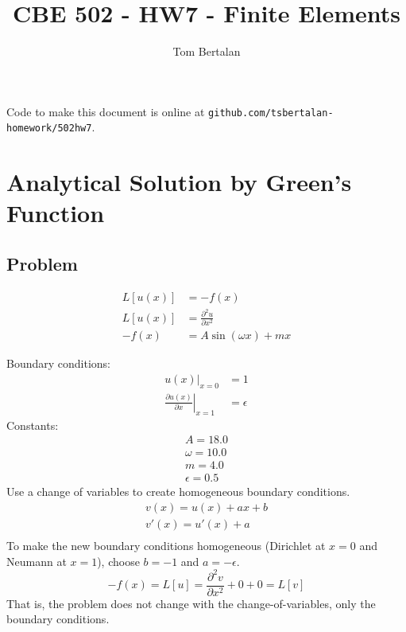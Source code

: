 \documentclass[10pt]{article}
\title{CBE 502 - HW7 - Finite Elements}
\author{Tom Bertalan}
\begin{document}
\maketitle

Code to make this document is online at \texttt{github.com/tsbertalan-homework/502hw7}.

\tableofcontents

\listoffigures

\section{Analytical Solution by Green's Function}
\label{sec:green}

\subsection{Problem}

\begin{equation}
    \label{eqn:problem}
    \begin{split}
        L[u(x)] &= -f(x) \\
        L[u(x)] &=  \frac{\partial^2 u}{\partial x^2} \\
        -f(x) &= A \sin (\omega x) + m x
    \end{split}
\end{equation}

Boundary conditions:
\begin{equation}
    \begin{split}
        \left. u(x) \right| _{x=0} &= 1 \\
        \left. \frac{\partial u(x)}{\partial x}\right|_{x=1} &= \epsilon
    \end{split}
\end{equation}
Constants:
\begin{equation}
    \label{eqn:constants}
    \begin{split}
        A = 18.0 \\
        \omega = 10.0 \\
        m = 4.0 \\
        \epsilon = 0.5
    \end{split}
\end{equation}
Use a change of variables to create homogeneous boundary conditions.
\begin{equation}
    \label{eqn:changeofvars}
    \begin{split}
        v(x) = u(x) + a x + b \\
        v'(x) = u'(x) + a \\
    \end{split}
\end{equation}
To make the new boundary conditions homogeneous (Dirichlet at $x=0$ and Neumann at $x=1$), choose $b=-1$ and $a=-\epsilon$.
$$
    -f(x) = L[u] = \frac{\partial^2 v}{\partial x^2} + 0 + 0 = L[v]
$$
That is, the problem does not change with the change-of-variables, only the boundary conditions.
\end{document}
